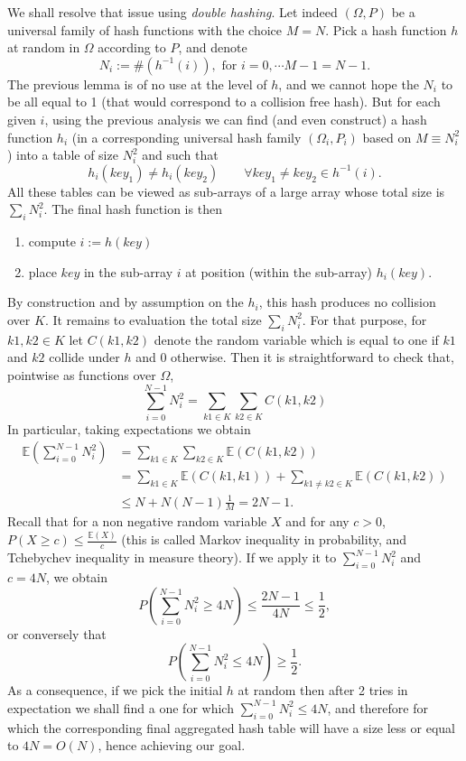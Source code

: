\documentclass[12pt]{article}
\theoremstyle{plain}
\theoremstyle{remark}
\begin{document}
We shall resolve that issue using {\it double hashing}. Let indeed $(\Omega, P)$ be a
universal family of hash functions with the choice $M = N$. Pick a hash
function $h$ at random in $\Omega$ according to $P$, and denote  
$$N_i := \#(h^{-1}(i)), \text{ for } i = 0,\cdots M - 1 = N-1.$$
The previous lemma is of no use at the level of $h$, and we cannot hope the $N_i$ to be all
equal to 1 (that would correspond to a collision free hash). But for each given
$i$, using the previous analysis we can find (and even construct) a hash function $h_i$ (in a
corresponding universal hash family $(\Omega_i,P_i)$ based on $M \equiv N_i^2$)
into a table of size $N_i^2$ and such that 
$$
h_i(key_1) \neq h_i(key_2) \qquad \forall key_1 \neq key_2 \in h^{-1}(i).
$$
All these tables can be viewed as sub-arrays of a large array whose total size is $\sum_i N_i^2.$ The final hash
function is then
\begin{enumerate}
	\item compute $i := h(key)$
	\item place $key$ in the sub-array $i$ at position (within the
		sub-array) $h_i(key)$.
\end{enumerate}
By construction and by assumption on the $h_i$, this hash produces no collision
over $K$. It remains to evaluation the total size $\sum_i N_i^2.$
For that purpose, for $k1, k2 \in K$ let $C(k1,k2)$ denote the random variable
which is equal to one if $k1$ and $k2$ collide under $h$ and 0 otherwise. Then
it is straightforward to check that, pointwise as functions over $\Omega$, 
$$
\sum_{i=0}^{N-1} N_i^2 = \sum_{k1 \in K} \sum_{k2 \in K} C(k1,k2)
$$
In particular, taking expectations we obtain 
\begin{equation*}\begin{split}
\mathbb{E}(\sum_{i=0}^{N-1} N_i^2) &= \sum_{k1 \in K} \sum_{k2 \in K}
\mathbb{E}(C(k1,k2))\\
&= \sum_{k1 \in K}\mathbb{E}(C(k1,k1)) + \sum_{k1 \neq k2 \in
K}\mathbb{E}(C(k1,k2))\\
& \leq N + N(N-1)\frac{1}{M} = 2N - 1.
\end{split}\end{equation*}
Recall that for a non negative random variable $X$ and for any $c>0$, $P(X
\geq c) \leq \frac{\mathbb{E}(X)}{c}$ (this is called Markov inequality in
probability, and Tchebychev inequality in measure theory). If we apply it to 
$\sum_{i=0}^{N-1} N_i^2$ and $c= 4N$, we obtain
$$
P(\sum_{i=0}^{N-1} N_i^2 \geq 4N) \leq \frac{2N-1}{4N} \leq \frac12,
$$
or conversely that
$$
P(\sum_{i=0}^{N-1} N_i^2 \leq 4N) \geq \frac12. 
$$
As a consequence, if we pick the initial $h$ at random then after 2 tries in
expectation we shall find a one for which $\sum_{i=0}^{N-1} N_i^2 \leq 4N$, and
therefore for which the corresponding final aggregated hash table will have a size
less or equal to $4N = O(N)$, hence achieving our goal.  
\end{document}
